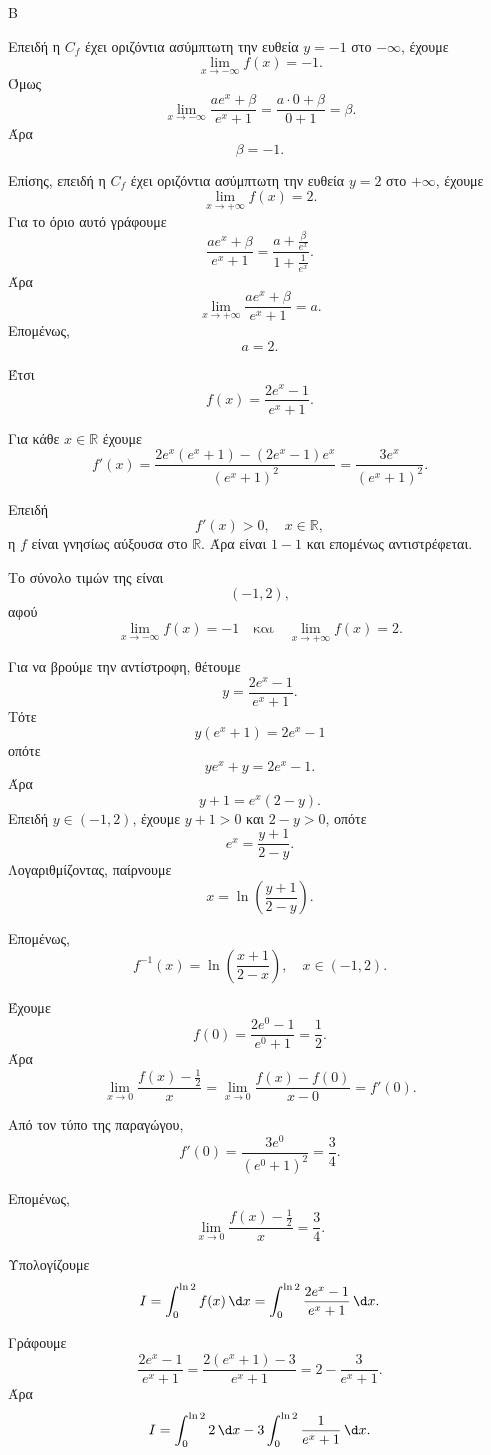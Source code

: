 
\begin{thema}{Β}
\begin{erwthma}
\item Επειδή η $C_f$ έχει οριζόντια ασύμπτωτη την ευθεία $y=-1$ στο $-\infty$, έχουμε
\[
\lim_{x\to-\infty} f(x)=-1.
\]
Όμως
\[
\lim_{x\to-\infty}\frac{ae^x+\beta}{e^x+1}
=\frac{a\cdot 0+\beta}{0+1}=\beta.
\]
Άρα
\[
\beta=-1.
\]

Επίσης, επειδή η $C_f$ έχει οριζόντια ασύμπτωτη την ευθεία $y=2$ στο $+\infty$, έχουμε
\[
\lim_{x\to+\infty} f(x)=2.
\]
Για το όριο αυτό γράφουμε
\[
\frac{ae^x+\beta}{e^x+1}
=\frac{a+\frac{\beta}{e^x}}{1+\frac{1}{e^x}}.
\]
Άρα
\[
\lim_{x\to+\infty}\frac{ae^x+\beta}{e^x+1}=a.
\]
Επομένως,
\[
a=2.
\]

Έτσι
\[
f(x)=\frac{2e^x-1}{e^x+1}.
\]

\item Για κάθε $x\in\mathbb{R}$ έχουμε
\[
f'(x)=\frac{2e^x(e^x+1)-(2e^x-1)e^x}{(e^x+1)^2}
=\frac{3e^x}{(e^x+1)^2}.
\]

Επειδή
\[
f'(x)>0,\quad x\in\mathbb{R},
\]
η $f$ είναι γνησίως αύξουσα στο $\mathbb{R}$. Άρα είναι $1-1$ και επομένως αντιστρέφεται.

Το σύνολο τιμών της είναι
\[
(-1,2),
\]
αφού
\[
\lim_{x\to-\infty}f(x)=-1
\quad \text{και}\quad
\lim_{x\to+\infty}f(x)=2.
\]

Για να βρούμε την αντίστροφη, θέτουμε
\[
y=\frac{2e^x-1}{e^x+1}.
\]
Τότε
\[
y(e^x+1)=2e^x-1
\]
οπότε
\[
ye^x+y=2e^x-1.
\]
Άρα
\[
y+1=e^x(2-y).
\]
Επειδή $y\in(-1,2)$, έχουμε $y+1>0$ και $2-y>0$, οπότε
\[
e^x=\frac{y+1}{2-y}.
\]
Λογαριθμίζοντας, παίρνουμε
\[
x=\ln\left(\frac{y+1}{2-y}\right).
\]

Επομένως,
\[
f^{-1}(x)=\ln\left(\frac{x+1}{2-x}\right),\quad x\in(-1,2).
\]

\item Έχουμε
\[
f(0)=\frac{2e^0-1}{e^0+1}=\frac{1}{2}.
\]
Άρα
\[
\lim_{x\to 0}\frac{f(x)-\frac{1}{2}}{x}
=\lim_{x\to 0}\frac{f(x)-f(0)}{x-0}
=f'(0).
\]

Από τον τύπο της παραγώγου,
\[
f'(0)=\frac{3e^0}{(e^0+1)^2}=\frac{3}{4}.
\]

Επομένως,
\[
\lim_{x\to 0}\frac{f(x)-\frac{1}{2}}{x}=\frac{3}{4}.
\]

\item Υπολογίζουμε
\[
I=\int_0^{\ln 2} f(x)\,\d x
=\int_0^{\ln 2}\frac{2e^x-1}{e^x+1}\,\d x.
\]

Γράφουμε
\[
\frac{2e^x-1}{e^x+1}
=\frac{2(e^x+1)-3}{e^x+1}
=2-\frac{3}{e^x+1}.
\]
Άρα
\[
I=\int_0^{\ln 2}2\,\d x-3\int_0^{\ln 2}\frac{1}{e^x+1}\,\d x.
\]


\end{erwthma}
\end{thema}
